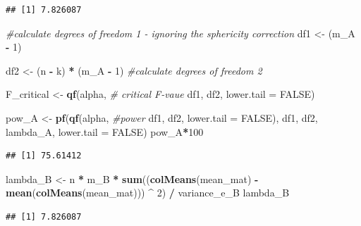 \documentclass[]{book}
\newenvironment{Shaded}{\begin{snugshade}}{\end{snugshade}}
\newcommand{\CommentTok}[1]{\textcolor[rgb]{0.56,0.35,0.01}{\textit{#1}}}
\newcommand{\DataTypeTok}[1]{\textcolor[rgb]{0.13,0.29,0.53}{#1}}
\newcommand{\DecValTok}[1]{\textcolor[rgb]{0.00,0.00,0.81}{#1}}
\newcommand{\KeywordTok}[1]{\textcolor[rgb]{0.13,0.29,0.53}{\textbf{#1}}}
\newcommand{\NormalTok}[1]{#1}
\newcommand{\OperatorTok}[1]{\textcolor[rgb]{0.81,0.36,0.00}{\textbf{#1}}}
\newcommand{\OtherTok}[1]{\textcolor[rgb]{0.56,0.35,0.01}{#1}}
\newcommand{\StringTok}[1]{\textcolor[rgb]{0.31,0.60,0.02}{#1}}
\begin{document}
\begin{verbatim}
## [1] 7.826087
\end{verbatim}

\begin{Shaded}
\begin{Highlighting}[]
\CommentTok{#calculate degrees of freedom 1 - ignoring the sphericity correction}
\NormalTok{df1 <-}\StringTok{ }\NormalTok{(m_A }\OperatorTok{-}\StringTok{ }\DecValTok{1}\NormalTok{) }

\NormalTok{df2 <-}\StringTok{ }\NormalTok{(n }\OperatorTok{-}\StringTok{ }\NormalTok{k) }\OperatorTok{*}\StringTok{ }\NormalTok{(m_A }\OperatorTok{-}\StringTok{ }\DecValTok{1}\NormalTok{) }\CommentTok{#calculate degrees of freedom 2}

\NormalTok{F_critical <-}\StringTok{ }\KeywordTok{qf}\NormalTok{(alpha, }\CommentTok{# critical F-vaue}
\NormalTok{                 df1,}
\NormalTok{                 df2, }
                 \DataTypeTok{lower.tail =} \OtherTok{FALSE}\NormalTok{) }

\NormalTok{pow_A <-}\StringTok{ }\KeywordTok{pf}\NormalTok{(}\KeywordTok{qf}\NormalTok{(alpha, }\CommentTok{#power }
\NormalTok{             df1, }
\NormalTok{             df2, }
             \DataTypeTok{lower.tail =} \OtherTok{FALSE}\NormalTok{), }
\NormalTok{          df1, }
\NormalTok{          df2, }
\NormalTok{          lambda_A, }
          \DataTypeTok{lower.tail =} \OtherTok{FALSE}\NormalTok{)}
\NormalTok{pow_A}\OperatorTok{*}\DecValTok{100}
\end{Highlighting}
\end{Shaded}

\begin{verbatim}
## [1] 75.61412
\end{verbatim}

\begin{Shaded}
\begin{Highlighting}[]
\NormalTok{lambda_B <-}
\StringTok{  }\NormalTok{n }\OperatorTok{*}\StringTok{ }\NormalTok{m_B }\OperatorTok{*}\StringTok{ }\KeywordTok{sum}\NormalTok{((}\KeywordTok{colMeans}\NormalTok{(mean_mat) }\OperatorTok{-}\StringTok{ }
\StringTok{                   }\KeywordTok{mean}\NormalTok{(}\KeywordTok{colMeans}\NormalTok{(mean_mat))) }\OperatorTok{^}\StringTok{ }\DecValTok{2}\NormalTok{) }\OperatorTok{/}\StringTok{ }\NormalTok{variance_e_B }
\NormalTok{lambda_B}
\end{Highlighting}
\end{Shaded}

\begin{verbatim}
## [1] 7.826087
\end{verbatim}
\end{document}
